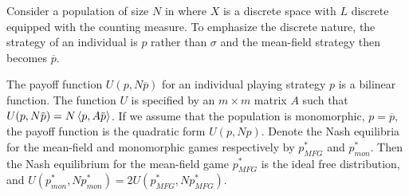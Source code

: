 \begin{proposition}
  \label{prop:doubleup}

  Consider a population of size $N$ in where $X$ is a discrete space with $L$ discrete equipped with the counting measure. To emphasize the discrete nature, the strategy of an individual is $p$ rather than $\sigma$ and the mean-field strategy then becomes $\overbar{p}$.

  The payoff function $U(p,N\overbar{p})$ for an individual playing strategy $p$ is a bilinear function. The function $U$ is specified by an $m\times m$ matrix $A$ such that $U(p,N\overbar{p}) = N\ip{p}{A \overbar{p}}$. If we assume that the population is monomorphic, $p = \overbar{p}$, the payoff function is the quadratic form $U(p,N p)$. Denote the Nash equilibria for the mean-field and monomorphic games respectively by $p^*_{MFG}$ and $p^*_{mon}$. Then the Nash equilibrium for the mean-field game $p^*_{MFG}$ is the ideal free distribution, and $U(p^*_{mon}, N p^*_{mon}) = 2U(p^*_{MFG},N p^*_{MFG})$.
\end{proposition}
